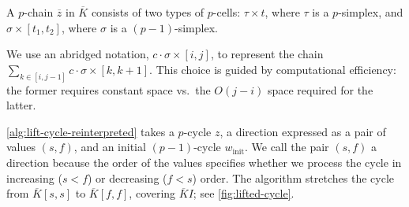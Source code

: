 \documentclass[cleveref,a4paper,english,nolineno]{socg-lipics-v2021}
\newcommand{\prism}[1]{\overline{#1}}
\newcommand{\pK}{\prism{K}}
\newcommand{\pz}{\prism{z}}
\newcommand{\ssx}{\sigma}
\newcommand{\tsx}{\tau}
\newcommand{\winit}{w_\textrm{init}}
\begin{document}
\begin{remark*}
    A $p$-chain $\pz$ in $\pK$ consists of two types of $p$-cells: $\tsx \times t$,
    where $\tsx$ is a $p$-simplex, and $\ssx \times [t_1, t_2]$, where $\ssx$ is a
    $(p-1)$-simplex.
\end{remark*}
\begin{remark*}
    We use an abridged notation,
    $c \cdot \ssx \times [i,j]$, to represent the chain
    $\sum_{k \in [i, j-1]} c \cdot \ssx \times [k,k+1]$.
    This choice is guided by computational efficiency:
    the former requires constant space vs.\ the $O(j-i)$ space required for the latter.
\end{remark*}


\cref{alg:lift-cycle-reinterpreted} takes a $p$-cycle $z$, a direction expressed as a pair of
values $(s,f)$, and an initial $(p-1)$-cycle $\winit$.
We call the pair $(s,f)$ a direction because the order of the values specifies
whether we process the cycle in increasing ($s < f$) or decreasing ($f < s$)
order. The algorithm stretches the cycle from $\pK[s,s]$ to $\pK[f,f]$,
covering $\pK I$; see \cref{fig:lifted-cycle}.
\end{document}
